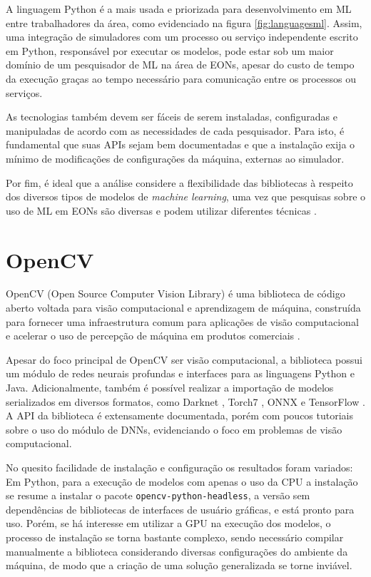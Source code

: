 A linguagem Python é a mais usada e priorizada para desenvolvimento em ML entre trabalhadores da área, como evidenciado na figura \ref{fig:languagesml}. Assim, uma integração de simuladores com um processo ou serviço independente escrito em Python, responsável por executar os modelos, pode estar sob um maior domínio de um pesquisador de ML na área de EONs, apesar do custo de tempo da execução graças ao tempo necessário para comunicação entre os processos ou serviços.

As tecnologias também devem ser fáceis de serem instaladas, configuradas e manipuladas de acordo com as necessidades de cada pesquisador. Para isto, é fundamental que suas \acrshort{API}s sejam bem documentadas e que a instalação exija o mínimo de modificações de configurações da máquina, externas ao simulador.

Por fim, é ideal que a análise considere a flexibilidade das bibliotecas à respeito dos diversos tipos de modelos de \textit{machine learning}, uma vez que pesquisas sobre o uso de ML em EONs são diversas e podem utilizar diferentes técnicas \cite{eon_ml_survey_2020}.

\section{OpenCV}

OpenCV (Open Source Computer Vision Library) é uma biblioteca de código aberto voltada para visão computacional e aprendizagem de máquina, construída para fornecer uma infraestrutura comum para aplicações de visão computacional e acelerar o uso de percepção de máquina em produtos comerciais \cite{ml_site_opencv}.

Apesar do foco principal de OpenCV ser visão computacional, a biblioteca possui um módulo de redes neurais profundas e interfaces para as linguagens Python e Java. Adicionalmente, também é possível realizar a importação de modelos serializados em diversos formatos, como Darknet \cite{ml_site_darknet}, Torch7 \cite{ml_site_torch}, ONNX \cite{ml_site_onnx} e TensorFlow \cite{ml_site_tensorflow}. A \acrshort{API} da biblioteca é extensamente documentada, porém com poucos tutoriais sobre o uso do módulo de DNNs, evidenciando o foco em problemas de visão computacional.

No quesito facilidade de instalação e configuração os resultados foram variados: Em Python, para a execução de modelos com apenas o uso da CPU a instalação se resume a instalar o pacote \texttt{opencv-python-headless}, a versão sem dependências de bibliotecas de interfaces de usuário gráficas, e está pronto para uso. Porém, se há interesse em utilizar a GPU na execução dos modelos, o processo de instalação se torna bastante complexo, sendo necessário compilar manualmente a biblioteca considerando diversas configurações do ambiente da máquina, de modo que a criação de uma solução generalizada se torne inviável.

